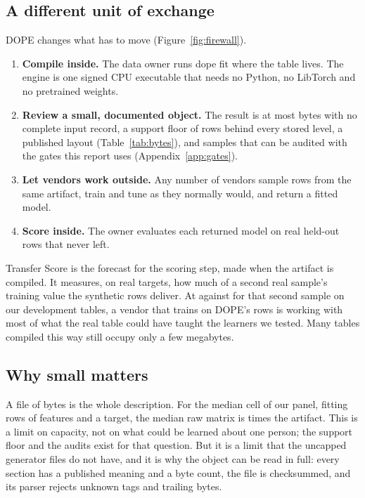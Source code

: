 \documentclass[10pt,letterpaper,twocolumn]{article}
\newcommand{\cli}[1]{{\ttfamily\fontsize{8.9}{11}\selectfont #1}}
\begin{document}
\subsection{A different unit of exchange}
DOPE changes what has to move (Figure~\ref{fig:firewall}).
\begin{enumerate}[leftmargin=1.45em,itemsep=2pt]
  \item \textbf{Compile inside.} The data owner runs \cli{dope fit} where the table lives. The engine is one signed CPU executable that needs no Python, no LibTorch and no pretrained weights.
  \item \textbf{Review a small, documented object.} The result is at most  bytes with no complete input record, a support floor of  rows behind every stored level, a published layout (Table~\ref{tab:bytes}), and samples that can be audited with the gates this report uses (Appendix~\ref{app:gates}).
  \item \textbf{Let vendors work outside.} Any number of vendors sample rows from the same artifact, train and tune as they normally would, and return a fitted model.
  \item \textbf{Score inside.} The owner evaluates each returned model on real held-out rows that never left.
\end{enumerate}
Transfer Score is the forecast for the scoring step, made when the artifact is compiled. It measures, on real targets, how much of a second real sample's training value the synthetic rows deliver. At  against  for that second sample on our development tables, a vendor that trains on DOPE's rows is working with most of what the real table could have taught the learners we tested. Many tables compiled this way still occupy only a few megabytes.

\subsection{Why small matters}
A file of  bytes is the whole description. For the median cell of our panel,  fitting rows of  features and a target, the median raw matrix is  times the artifact. This is a limit on capacity, not on what could be learned about one person; the support floor and the audits exist for that question. But it is a limit that the uncapped generator files do not have, and it is why the object can be read in full: every section has a published meaning and a byte count, the file is checksummed, and its parser rejects unknown tags and trailing bytes.
\end{document}
